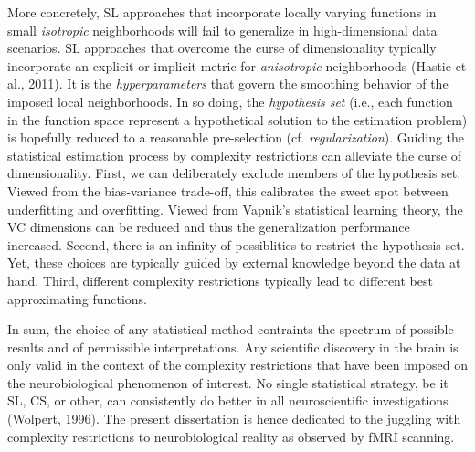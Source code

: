 \documentclass[authoryear,review,3p]{elsarticle}
\begin{document}
More concretely,
SL approaches that incorporate locally varying functions
in small \textit{isotropic} neighborhoods
will fail to generalize in high-dimensional data scenarios.
SL approaches that overcome the curse of dimensionality typically
incorporate an explicit or implicit metric for
\textit{anisotropic} neighborhoods
(Hastie et al., 2011).
%
It is the \textit{hyperparameters} that govern the
smoothing behavior of the imposed local neighborhoods.
%
In so doing,
the \textit{hypothesis set} (i.e., each function in the function space
represent a hypothetical solution to
the estimation problem) is hopefully reduced to
a reasonable pre-selection (cf. \textit{regularization}).
%
Guiding the statistical estimation process by
complexity restrictions can alleviate the curse of dimensionality.
First,
we can deliberately exclude members of the hypothesis set.
Viewed from the bias-variance trade-off, this calibrates
the sweet spot between underfitting and overfitting.
Viewed from Vapnik's statistical learning theory,
the VC dimensions can be reduced and thus the generalization performance
increased.
%
Second, there is an infinity of possiblities to restrict the hypothesis set.
Yet, these choices are typically guided by external knowledge beyond
the data at hand.
%
Third,
different complexity restrictions typically lead to different
best approximating functions.


In sum,
the choice of any statistical method contraints
the spectrum of possible results and of permissible interpretations.
Any scientific discovery in the brain is only valid in the
context of the complexity restrictions that have been imposed
on the neurobiological phenomenon of interest.
%
No single statistical strategy, be it SL, CS, or other,
can consistently
do better in all neuroscientific investigations
(Wolpert, 1996).
%
The present dissertation
is hence dedicated to the juggling with
complexity restrictions to
neurobiological reality as observed by fMRI scanning.
\end{document}
